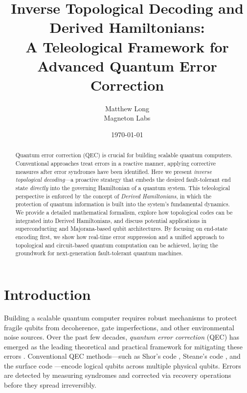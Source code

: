 \documentclass[11pt]{article}
\begin{document}
\title{\textbf{Inverse Topological Decoding and Derived Hamiltonians:\\
A Teleological Framework for Advanced Quantum Error Correction}}
\author{Matthew Long \\
Magneton Labs}
\date{\today}

\maketitle

\begin{abstract}
Quantum error correction (QEC) is crucial for building scalable quantum computers. Conventional approaches treat errors in a reactive manner, applying corrective measures after error syndromes have been identified. Here we present \emph{inverse topological decoding}---a proactive strategy that embeds the desired fault-tolerant end state \emph{directly} into the governing Hamiltonian of a quantum system. This teleological perspective is enforced by the concept of \emph{Derived Hamiltonians}, in which the protection of quantum information is built into the system's fundamental dynamics. We provide a detailed mathematical formalism, explore how topological codes can be integrated into Derived Hamiltonians, and discuss potential applications in superconducting and Majorana-based qubit architectures. By focusing on end-state encoding first, we show how real-time error suppression and a unified approach to topological and circuit-based quantum computation can be achieved, laying the groundwork for next-generation fault-tolerant quantum machines.
\end{abstract}

\tableofcontents

\section{Introduction}

Building a scalable quantum computer requires robust mechanisms to protect fragile qubits from decoherence, gate imperfections, and other environmental noise sources. Over the past few decades, \emph{quantum error correction} (QEC) has emerged as the leading theoretical and practical framework for mitigating these errors \cite{NielsenChuang, Preskill, Terhal}. Conventional QEC methods---such as Shor's code \cite{Shor}, Steane's code \cite{Steane}, and the surface code \cite{BravyiKitaev, FowlerSurfaceCode}---encode logical qubits across multiple physical qubits. Errors are detected by measuring syndromes and corrected via recovery operations before they spread irreversibly.
\end{document}
